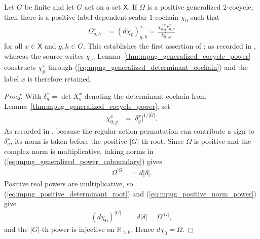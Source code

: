 \begin{lemma}
    \label{thm:mpug_positive_generalized_cocycle}
    \leanok
    Let $G$ be finite and let $G$ act on a set $\mathsf X$. If $\Omega$ is a
    positive generalized $2$-cocycle, then there is a positive
    label-dependent scalar $1$-cochain $\chi_0$ such that
    \begin{align}
        \Omega^x_{g,h}
         & =(d\chi_0)^x_{g,h}
        =\frac{\chi^{\,h x}_{0,g}\chi^x_{0,h}}
         {\chi^x_{0,gh}}
        \label{eq:mpug_positive_coboundary}
    \end{align}
    for all $x\in\mathsf X$ and $g,h\in G$.
    This establishes the first assertion of
    \cite[Corollary at lines~5950--5960]{FrancoRubio2025MPUGauging}; as
    recorded in \cite{gap:fbc25_positive_generalized_cocycle_block_index},
    whereas the source writes $\chi_g$,
    Lemma~\ref{thm:mpug_generalized_cocycle_power} constructs $\chi^x_g$
    through (\ref{eq:mpug_generalized_determinant_cochain}) and the label
    $x$ is therefore retained.
\end{lemma}

\begin{proof}\leanok
    With $\delta^x_g=\det X^x_g$ denoting the determinant cochain from
    Lemma~\ref{thm:mpug_generalized_cocycle_power}, set
    \begin{align}
        \chi^x_{0,g}
         & =\lvert\delta^x_g\rvert^{1/\lvert G\rvert}.
        \label{eq:mpug_positive_determinant_root}
    \end{align}
    As recorded in
    \cite{gap:fbc25_positive_generalized_cocycle_determinant_sign}, because
    the regular-action permutation can contribute a sign to $\delta^x_g$, its
    norm is taken before the positive $\lvert G\rvert$-th root.
    Since $\Omega$ is positive and the complex norm is multiplicative, taking
    norms in (\ref{eq:mpug_generalized_power_coboundary}) gives
    \begin{align}
        \Omega^{\lvert G\rvert} & =d\lvert\delta\rvert.
        \label{eq:mpug_positive_norm_power}
    \end{align}
    Positive real powers are multiplicative, so
    (\ref{eq:mpug_positive_determinant_root}) and
    (\ref{eq:mpug_positive_norm_power}) give
    \begin{align}
        (d\chi_0)^{\lvert G\rvert}
         & =d\lvert\delta\rvert=\Omega^{\lvert G\rvert},
        \label{eq:mpug_positive_root_power}
    \end{align}
    and the $\lvert G\rvert$-th power is injective on $\mathbb R_{>0}$. Hence
    $d\chi_0=\Omega$.
\end{proof}

